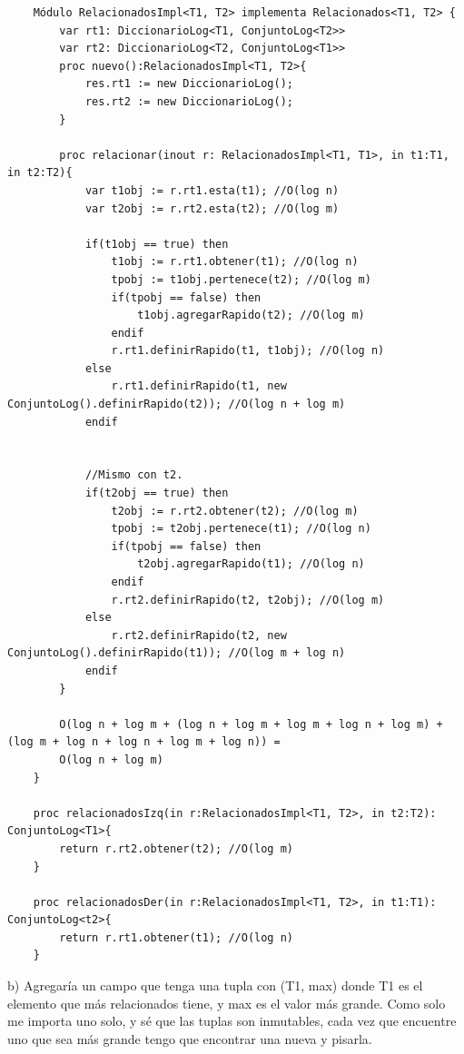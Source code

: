 \documentclass[10pt,a4paper]{article}
\begin{document}
\begin{lstlisting}
    Módulo RelacionadosImpl<T1, T2> implementa Relacionados<T1, T2> {
        var rt1: DiccionarioLog<T1, ConjuntoLog<T2>>
        var rt2: DiccionarioLog<T2, ConjuntoLog<T1>>
        proc nuevo():RelacionadosImpl<T1, T2>{
            res.rt1 := new DiccionarioLog();
            res.rt2 := new DiccionarioLog();
        }

        proc relacionar(inout r: RelacionadosImpl<T1, T1>, in t1:T1, in t2:T2){
            var t1obj := r.rt1.esta(t1); //O(log n)
            var t2obj := r.rt2.esta(t2); //O(log m)

            if(t1obj == true) then 
                t1obj := r.rt1.obtener(t1); //O(log n)
                tpobj := t1obj.pertenece(t2); //O(log m)
                if(tpobj == false) then
                    t1obj.agregarRapido(t2); //O(log m)
                endif 
                r.rt1.definirRapido(t1, t1obj); //O(log n)
            else 
                r.rt1.definirRapido(t1, new ConjuntoLog().definirRapido(t2)); //O(log n + log m)
            endif 
            

            //Mismo con t2.
            if(t2obj == true) then 
                t2obj := r.rt2.obtener(t2); //O(log m)
                tpobj := t2obj.pertenece(t1); //O(log n)
                if(tpobj == false) then
                    t2obj.agregarRapido(t1); //O(log n)
                endif 
                r.rt2.definirRapido(t2, t2obj); //O(log m)
            else 
                r.rt2.definirRapido(t2, new ConjuntoLog().definirRapido(t1)); //O(log m + log n)
            endif 
        }

        O(log n + log m + (log n + log m + log m + log n + log m) + (log m + log n + log n + log m + log n)) =
        O(log n + log m)
    }

    proc relacionadosIzq(in r:RelacionadosImpl<T1, T2>, in t2:T2): ConjuntoLog<T1>{
        return r.rt2.obtener(t2); //O(log m)
    }

    proc relacionadosDer(in r:RelacionadosImpl<T1, T2>, in t1:T1): ConjuntoLog<t2>{
        return r.rt1.obtener(t1); //O(log n)
    }

\end{lstlisting}
b) Agregaría un campo que tenga una tupla con (T1, max) donde T1 es el elemento que más relacionados tiene, y max es el valor más grande. Como solo me importa uno solo, y sé que las tuplas son inmutables, cada vez que encuentre uno que sea más grande tengo que encontrar una nueva y pisarla. \\
\end{document}
